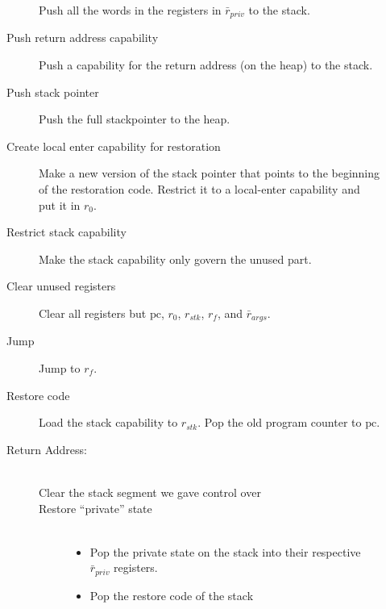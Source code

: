 \documentclass[a4paper]{article}
\newcommand{\forcenewline}{$\phantom{v}$\\}
\newcommand{\var}[1]{\mathit{#1}}
\newcommand{\pcreg}{\mathrm{pc}}
\begin{document}
\begin{description}
\begin{description}
    Push all the words in the registers in  $\bar{r}_{\var{priv}}$ to the stack.
  \item [Push return address capability]
    Push a capability for the return address (on the heap) to the stack.
  \item [Push stack pointer]
    Push the full stackpointer to the heap.
  \item [Create local enter capability for restoration]
    Make a new version of the stack pointer that points to the beginning of the restoration code. Restrict it to a local-enter capability and put it in $r_0$.
  \item [Restrict stack capability]
    Make the stack capability only govern the unused part.
  \item [Clear unused registers]
    Clear all registers but $\pcreg$, $r_0$, $r_{\var{stk}}$, $r_f$, and $\bar{r}_{\var{args}}$.
  \item [Jump] Jump to $r_f$.
  \item [Restore code]
    Load the stack capability to $r_{\var{stk}}$. Pop the old program counter to $\pcreg$.
  \item [Return Address:] \forcenewline
    \begin{description}
    \item [Clear the stack segment we gave control over]
    \item [Restore ``private'' state] \forcenewline
      \begin{itemize}
      \item Pop the private state on the stack into their respective $\bar{r}_{\var{priv}}$ registers.
      \item Pop the restore code of the stack
      \end{itemize}
  \end{description}
\end{description}
\end{description}
\end{document}
